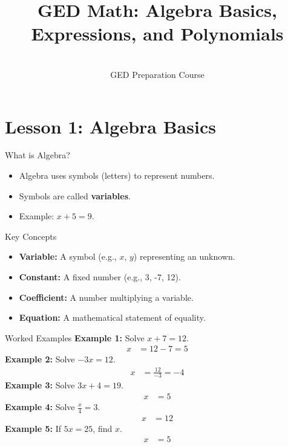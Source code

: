 \documentclass{beamer}
\title{GED Math: Algebra Basics, Expressions, and Polynomials}
\date{\\GED Preparation Course}
\begin{document}
\begin{frame}
  \titlepage
\end{frame}

\section{Lesson 1: Algebra Basics}

\begin{frame}{What is Algebra?}
\begin{itemize}
    \item Algebra uses symbols (letters) to represent numbers.
    \item Symbols are called \textbf{variables}.
    \item Example: $x + 5 = 9$.
\end{itemize}
\end{frame}

\begin{frame}{Key Concepts}
\begin{itemize}
    \item \textbf{Variable:} A symbol (e.g., $x$, $y$) representing an unknown.
    \item \textbf{Constant:} A fixed number (e.g., 3, -7, 12).
    \item \textbf{Coefficient:} A number multiplying a variable.
    \item \textbf{Equation:} A mathematical statement of equality.
\end{itemize}
\end{frame}

\begin{frame}{Worked Examples}
\textbf{Example 1:} Solve $x + 7 = 12$.
\begin{align*}
  x &= 12 - 7 = 5
\end{align*}
\textbf{Example 2:} Solve $-3x = 12$.
\begin{align*}
  x &= \frac{12}{-3} = -4
\end{align*}
\textbf{Example 3:} Solve $3x + 4 = 19$.
\begin{align*}
  x &= 5
\end{align*}
\textbf{Example 4:} Solve $\frac{x}{4} = 3$.
\begin{align*}
  x &= 12
\end{align*}
\textbf{Example 5:} If $5x = 25$, find $x$.
\begin{align*}
  x &= 5
\end{align*}
\end{frame}
\end{document}
